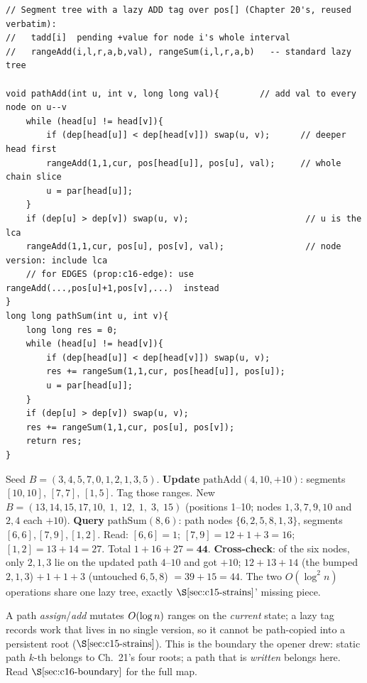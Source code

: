 \begin{lstlisting}[caption={Path update + path query over the HLD order: the jump loop of lst:c16-pathquery with Ch.20's lazy range-write (ADD shown; ASSIGN identical shape). Edges handled via pos[head] vs pos[lca]+1 as in prop:c16-edge.}, label={lst:c16-pathupdate}]
// Segment tree with a lazy ADD tag over pos[] (Chapter 20's, reused verbatim):
//   tadd[i]  pending +value for node i's whole interval
//   rangeAdd(i,l,r,a,b,val), rangeSum(i,l,r,a,b)   -- standard lazy tree

void pathAdd(int u, int v, long long val){        // add val to every node on u--v
    while (head[u] != head[v]){
        if (dep[head[u]] < dep[head[v]]) swap(u, v);      // deeper head first
        rangeAdd(1,1,cur, pos[head[u]], pos[u], val);     // whole chain slice
        u = par[head[u]];
    }
    if (dep[u] > dep[v]) swap(u, v);                       // u is the lca
    rangeAdd(1,1,cur, pos[u], pos[v], val);                // node version: include lca
    // for EDGES (prop:c16-edge): use  rangeAdd(...,pos[u]+1,pos[v],...)  instead
}
long long pathSum(int u, int v){
    long long res = 0;
    while (head[u] != head[v]){
        if (dep[head[u]] < dep[head[v]]) swap(u, v);
        res += rangeSum(1,1,cur, pos[head[u]], pos[u]);
        u = par[head[u]];
    }
    if (dep[u] > dep[v]) swap(u, v);
    res += rangeSum(1,1,cur, pos[u], pos[v]);
    return res;
}
\end{lstlisting}

\begin{tracebox}
Seed \(B=(3,4,5,7,0,1,2,1,3,5)\). \textbf{Update} \(\text{pathAdd}(4,10,+10)\): segments \([10,10]\), \([7,7]\), \([1,5]\). Tag those ranges. New \(B=(13,14,15,17,10,\;1,\;12,\;1,\;3,\;15)\) (positions 1--10; nodes \(1,3,7,9,10\) and \(2,4\) each \(+10\)). \textbf{Query} \(\text{pathSum}(8,6)\): path nodes \(\{6,2,5,8,1,3\}\), segments \([6,6],[7,9],[1,2]\). Read: \([6,6]=1\); \([7,9]=12{+}1{+}3=16\); \([1,2]=13{+}14=27\). Total \(1+16+27=\mathbf{44}\). \textbf{Cross-check}: of the six nodes, only \(2,1,3\) lie on the updated path \(4\)--\(10\) and got \(+10\); \(12{+}13{+}14\) (the bumped \(2,1,3\)) \(+\,1{+}1{+}3\) (untouched \(6,5,8\)) \(=39+15=44\). The two \(O(\log^2 n)\) operations share one lazy tree, exactly \(\secref{c15-strains}\)' missing piece.
\end{tracebox}

\begin{notebox}
A path \emph{assign}/\emph{add} mutates \(O(\log n)\) ranges on the \emph{current} state; a lazy tag records work that lives in no single version, so it cannot be path-copied into a persistent root (\(\secref{c15-strains}\)).  This is the boundary the opener drew: static path \(k\)-th belongs to Ch.~21's four roots; a path that is \emph{written} belongs here.  Read \(\secref{c16-boundary}\) for the full map.
\end{notebox}

